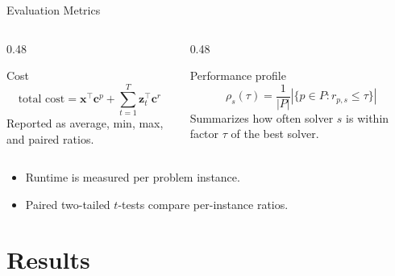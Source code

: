 \documentclass[aspectratio=169,10pt]{beamer}
\newcommand{\cp}{\mathbf{c}^{p}}
\newcommand{\cr}{\mathbf{c}^{r}}
\newcommand{\x}{\mathbf{x}}
\newcommand{\zt}{\mathbf{z}_{t}}
\begin{document}
\begin{frame}{Evaluation Metrics}
  \begin{columns}[T,totalwidth=\textwidth]
    \begin{column}{0.48\textwidth}
      \begin{block}{Cost}
        \[
          \text{total cost} =
          \x^\top\cp + \sum_{t=1}^{T}\zt^\top\cr
        \]
        Reported as average, min, max, and paired ratios.
      \end{block}
    \end{column}
    \begin{column}{0.48\textwidth}
      \begin{block}{Performance profile}
        \[
          \rho_s(\tau)=
          \frac{1}{|P|}
          \left|\{p\in P:r_{p,s}\leq\tau\}\right|
        \]
        Summarizes how often solver $s$ is within factor $\tau$ of the best solver.
      \end{block}
    \end{column}
  \end{columns}
  \vspace{0.2cm}
  \begin{itemize}
    \item Runtime is measured per problem instance.
    \item Paired two-tailed $t$-tests compare per-instance ratios.
  \end{itemize}
\end{frame}

\section{Results}
\end{document}
